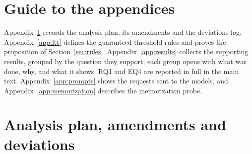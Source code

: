 \section*{Guide to the appendices}
Appendix~\ref{app:deviations} records the analysis plan, its amendments and the deviations log.
Appendix~\ref{app:ltt} defines the guaranteed threshold rules and proves the proposition of Section~\ref{sec:rules}.
Appendix~\ref{app:results} collects the supporting results, grouped by the question they support; each group opens with
what was done, why, and what it shows. RQ1 and EQ4 are reported in full in the main text. Appendix~\ref{app:prompts} shows
the requests sent to the models, and Appendix~\ref{app:memorization} describes the memorization probe.

\section{Analysis plan, amendments and deviations}
\label{app:deviations}

